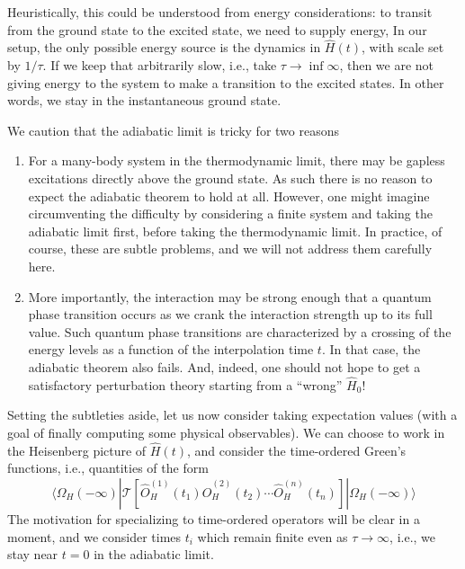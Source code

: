 Heuristically, this could be understood from energy considerations: to transit from the ground state to the excited state, we need to supply energy, In our setup, the only possible energy source is the dynamics in $\hat{H}(t)$, with scale set by $1/\tau$. If we keep that arbitrarily slow, i.e., take $\tau\to \inf\infty$, then we are not giving energy to the system to make a transition to the excited states. In other words, we stay in the instantaneous ground state.

We caution that the adiabatic limit is tricky for two reasons
\begin{enumerate}
    \item For a many-body system in the thermodynamic limit, there may be gapless excitations directly above the ground state. As such there is no reason to expect the adiabatic theorem to hold at all. However, one might imagine circumventing the difficulty by considering a finite system and taking the adiabatic limit first, before taking the thermodynamic limit. In practice, of course, these are subtle problems, and we will not address them carefully here.
    \item More importantly, the interaction may be strong enough that a quantum phase transition occurs as we crank the interaction strength up to its full value. Such quantum phase transitions are characterized by a crossing of the energy levels as a function of the interpolation time $t$. In that case, the adiabatic theorem also fails. And, indeed, one should not hope to get a satisfactory perturbation theory starting from a ``wrong'' $\hat{H}_0$!
\end{enumerate}

Setting the subtleties aside, let us now consider taking expectation values (with a goal of finally computing some physical observables). We can choose to work in the Heisenberg picture of $\hat{H}(t)$, and consider the time-ordered Green's functions, i.e., quantities of the form
\[ \langle \Omega _H\left( -\infty \right) |\mathcal{T} \left[ \hat{O}_{H}^{\left( 1 \right)}\left( t_1 \right) \hat{O}_{H}^{\left( 2 \right)}\left( t_2 \right) \cdots \hat{O}_{H}^{\left( n \right)}\left( t_n \right) \right] |\Omega _H\left( -\infty \right) \rangle \]
The motivation for specializing to time-ordered operators will be clear in a moment, and we consider times $t_i$ which remain finite even as $\tau\to\infty$, i.e., we stay near $t=0$ in the adiabatic limit.

